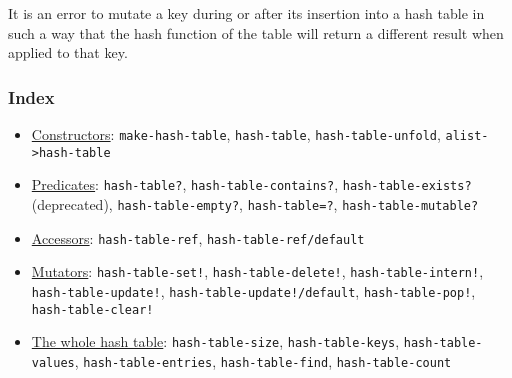 It is an error to mutate a key during or after its insertion into a hash
table in such a way that the hash function of the table will return a
different result when applied to that key.

\subsubsection{Index}\label{Index}

\begin{itemize}
\tightlist
\item
  \href{http://srfi.schemers.org/srfi-125/srfi-125.html\#Constructors}{Constructors}:
  \texttt{make-hash-table}, \texttt{hash-table},
  \texttt{hash-table-unfold}, \texttt{alist-\textgreater{}hash-table}
\end{itemize}

\begin{itemize}
\tightlist
\item
  \href{http://srfi.schemers.org/srfi-125/srfi-125.html\#Predicates}{Predicates}:
  \texttt{hash-table?}, \texttt{hash-table-contains?},
  \texttt{hash-table-exists?} (deprecated), \texttt{hash-table-empty?},
  \texttt{hash-table=?}, \texttt{hash-table-mutable?}
\end{itemize}

\begin{itemize}
\tightlist
\item
  \href{http://srfi.schemers.org/srfi-125/srfi-125.html\#Accessors}{Accessors}:
  \texttt{hash-table-ref}, \texttt{hash-table-ref/default}
\end{itemize}

\begin{itemize}
\tightlist
\item
  \href{http://srfi.schemers.org/srfi-125/srfi-125.html\#Mutators}{Mutators}:
  \texttt{hash-table-set!}, \texttt{hash-table-delete!},
  \texttt{hash-table-intern!}, \texttt{hash-table-update!},
  \texttt{hash-table-update!/default}, \texttt{hash-table-pop!},
  \texttt{hash-table-clear!}
\end{itemize}

\begin{itemize}
\tightlist
\item
  \href{http://srfi.schemers.org/srfi-125/srfi-125.html\#Thewholehashtable}{The
  whole hash table}: \texttt{hash-table-size}, \texttt{hash-table-keys},
  \texttt{hash-table-values}, \texttt{hash-table-entries},
  \texttt{hash-table-find}, \texttt{hash-table-count}
\end{itemize}

